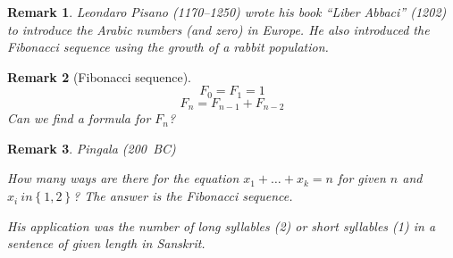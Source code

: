 \documentclass{article}
\newtheorem{remark}{Remark}  \numberwithin{remark}{section}
\newcommand{\set}[1]{\left\{#1\right\}}
\begin{document}
\begin{remark}
  Leondaro Pisano (1170--1250) wrote his book \enquote{Liber Abbaci} (1202) to introduce the Arabic numbers (and zero) in Europe.
  He also introduced the Fibonacci sequence using the growth of a rabbit population.
\end{remark}

\begin{remark}[Fibonacci sequence]
  \[ F_0 = F_1 = 1 \]
  \[ F_n = F_{n-1} + F_{n-2} \]
  Can we find a formula for $F_n$?
\end{remark}

\begin{remark}
  Pingala (200~BC)

  How many ways are there for the equation $x_1 + \dots + x_k = n$ for given $n$ and $x_i \ in \set{1,2}$?
  The answer is the Fibonacci sequence.

  His application was the number of long syllables (2) or short syllables (1) in a sentence of given length in Sanskrit.
\end{remark}
\end{document}
